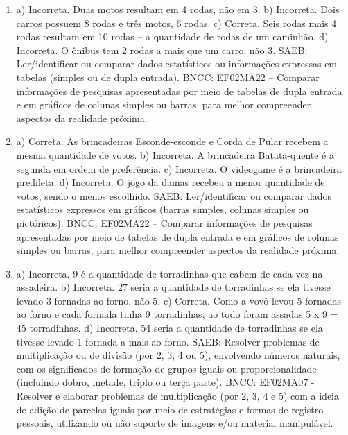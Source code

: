 \begin{enumerate}
\item
a) Incorreta. Duas motos resultam em 4 rodas, não em 3.
b) Incorreta. Dois carros possuem 8 rodas e três motos, 6 rodas.
c) Correta. Seis rodas mais 4 rodas resultam em 10 rodas -- a quantidade de rodas de um caminhão.
d) Incorreta. O ônibus tem 2 rodas a mais que um carro, não 3.
SAEB: Ler/identificar ou comparar dados estatísticos ou
informações expressas em tabelas (simples ou de dupla entrada).
BNCC: EF02MA22 -- Comparar informações de pesquisas apresentadas por meio
de tabelas de dupla entrada e em gráficos de colunas simples ou barras,
para melhor compreender aspectos da realidade próxima.

\item
a) Correta. As brincadeiras Esconde-esconde e Corda de Pular
recebem a mesma quantidade de votos.
b) Incorreta. A brincadeira Batata-quente é a segunda em ordem de
preferência.
c) Incorreta. O videogame é a brincadeira predileta.
d) Incorreta. O jogo da damas recebeu a menor quantidade de votos,
sendo o menos escolhido.
SAEB: Ler/identificar ou comparar dados estatísticos expressos
em gráficos (barras simples, colunas simples ou pictóricos).
BNCC: EF02MA22 -- Comparar informações de pesquisas apresentadas por meio
de tabelas de dupla entrada e em gráficos de colunas simples ou barras,
para melhor compreender aspectos da realidade próxima.

\item
a) Incorreta. 9 é a quantidade de torradinhas que cabem de cada vez na assadeira.
b) Incorreta. 27 seria a quantidade de torradinhas se ela tivesse levado 3 fornadas ao forno, não 5.
c) Correta. Como a vovó levou 5 fornadas ao forno e cada fornada tinha 9 torradinhas, ao todo foram assadas 5 x 9 = 45 torradinhas.
d) Incorreta. 54 seria a quantidade de torradinhas se ela tivesse levado 1 fornada a mais ao forno.
SAEB: Resolver problemas de multiplicação ou de divisão (por 2,
3, 4 ou 5), envolvendo números naturais, com os significados de formação
de grupos iguais ou proporcionalidade (incluindo dobro, metade, triplo
ou terça parte).
BNCC: EF02MA07 - Resolver e elaborar problemas de multiplicação (por 2,
3, 4 e 5) com a ideia de adição de parcelas iguais por meio de
estratégias e formas de registro pessoais, utilizando ou não suporte de
imagens e/ou material manipulável.


\end{enumerate}
